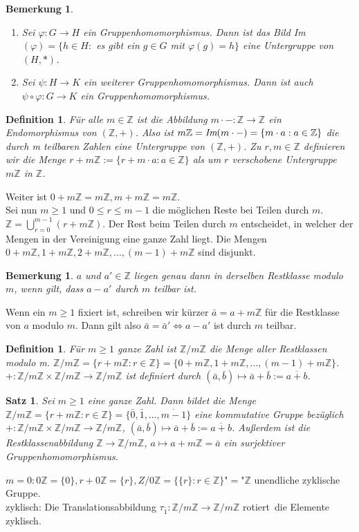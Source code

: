 \documentclass[12pt,a4paper]{article}
\theoremstyle{plain}
\newtheorem{Satz}[Theorem]{Satz}
\newtheorem{Definition}[Theorem]{Definition}
\newtheorem{Bemerkung}[Theorem]{Bemerkung}
\newcommand{\Z}{\mathbb{Z}}
\numberwithin{equation}{section}
\begin{document}
\begin{Bemerkung}\ 
\begin{enumerate}
\renewcommand{\labelenumi}{(\alph{enumi})}
\item Sei $\varphi:G\rightarrow H$ ein Gruppenhomomorphismus. Dann ist das Bild Im$(\varphi)=\{h\in H:$ es gibt ein $g\in G$ mit $\varphi(g)=h\}$ eine Untergruppe von $(H,*)$.
\item Sei $\psi: H\rightarrow K$ ein weiterer Gruppenhomomorphismus. Dann ist auch $\psi\circ\varphi:G\rightarrow K$ ein Gruppenhomomorphismus.
\end{enumerate}
\end{Bemerkung}
\begin{Definition}
Für alle $m\in\Z$ ist die Abbildung $m\cdot - :\Z\rightarrow\Z$ ein Endomorphismus von $(\Z,+)$. Also ist $m\Z=\emph{Im}(m\cdot -)=\{m\cdot a: a\in \Z\}$ die durch m teilbaren Zahlen eine Untergruppe von $(\Z,+)$.
Zu $r,m \in \Z$ definieren wir die Menge $r + m\Z:=\{r+m\cdot a: a\in \Z\}$ als um $r$ verschobene Untergruppe $m\Z$ in $\Z$.
\end{Definition}
Weiter ist $0+m\Z=m\Z, m+m\Z=m\Z$.\\
Sei nun $m\geq 1$ und $0\leq r\leq m-1$ \glqq die möglichen Reste bei Teilen durch $m$\grqq. $\Z=\bigcup_{r=0}^{m-1}{(r+m\Z)}$. Der Rest beim Teilen durch $m$ entscheidet, in welcher der Mengen in der Vereinigung eine ganze Zahl liegt. Die Mengen $0+m\Z,1+m\Z,2+m\Z,\ldots,(m-1)+m\Z$ sind disjunkt.
\begin{Bemerkung}
$a$ und $a'\in \Z$ liegen genau dann in derselben Restklasse modulo $m$, wenn gilt, dass $a-a'$ durch $m$ teilbar ist.
\end{Bemerkung}
Wenn ein $m\geq 1$ fixiert ist, schreiben wir kürzer $\bar{a}=a+m\Z$ für die Restklasse von $a$ modulo $m$. Dann gilt also $\bar{a}=\bar{a}' \Leftrightarrow a-a'$ ist durch $m$ teilbar.
\begin{Definition}
Für $m\geq 1$ ganze Zahl ist $\Z/m\Z$ die Menge aller Restklassen modulo m. $\Z/m\Z=\{r+m\Z:r\in\Z\}=\{0+m\Z,1+m\Z,\ldots,(m-1)+m\Z\}$. $+:\Z/m\Z\times\Z/m\Z\rightarrow\Z/m\Z$ ist definiert durch $(\bar{a},\bar{b})\mapsto \bar{a}+\bar{b}:=\overline{a+b}$. 
\end{Definition}
\begin{Satz}
Sei $m\geq 1$ eine ganze Zahl. Dann bildet die Menge $\Z/m\Z=\{r+m\Z: r\in \Z\}=\{\bar{0},\bar{1},\ldots,\overline{m-1}\}$ eine kommutative Gruppe bezüglich $+:\Z/m\Z\times\Z/m\Z\rightarrow\Z/m\Z$, $(\bar{a},\bar{b})\mapsto \bar{a}+\bar{b}:=\overline{a+b}$. Außerdem ist die Restklassenabbildung $\Z\rightarrow \Z/m\Z$, $ a\mapsto a+m\Z=\bar{a}$ ein surjektiver Gruppenhomomorphismus.
\end{Satz}
$m=0: 0\Z=\{0\}, r+0\Z=\{r\}, Z/0\Z=\{\{r\}:r\in\Z\}$"$=$"$\Z$ unendliche zyklische Gruppe.\\
zyklisch: Die Translationsabbildung $\tau_{\bar{1}}:\Z/m\Z\rightarrow\Z/m\Z$ \glqq rotiert\grqq\ die Elemente zyklisch.
\end{document}
